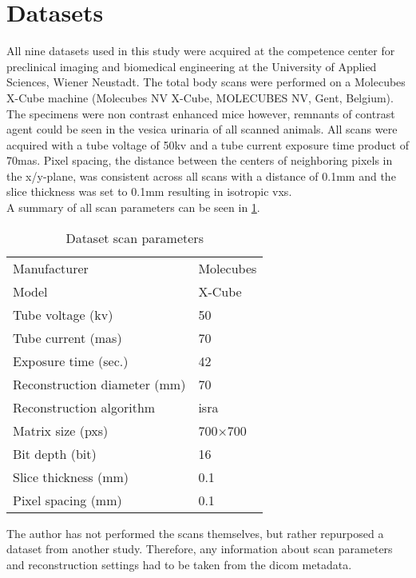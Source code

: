 \section{Datasets}\label{s:datasets}
All nine datasets used in this study were acquired at the competence center for preclinical imaging and biomedical engineering at the University of Applied Sciences, Wiener Neustadt.
The total body scans were performed on a Molecubes X-Cube \mct\space machine (Molecubes NV X-Cube, MOLECUBES NV, Gent, Belgium).
The specimens were non contrast enhanced mice however, remnants of contrast agent could be seen in the vesica urinaria of all scanned animals.
All scans were acquired with a tube voltage of 50\acrshort{kv} and a tube current exposure time product of 70\acrshort{mas}.
Pixel spacing, the distance between the centers of neighboring pixels in the x/y-plane, was consistent across all scans with a distance of 0.1mm and the slice thickness was set to 0.1mm resulting in isotropic \glspl{vx}.\\
A summary of all scan parameters can be seen in \cref{tab:scan-parameters}.
\begin{table}
	\begin{center}
		\begin{tabular}{l l}
			Manufacturer                  & Molecubes      \\
			Model                         & X-Cube         \\
			Tube voltage (\acrshort{kv})  & 50             \\
			Tube current (\acrshort{mas}) & 70             \\
			Exposure time (sec.)          & 42             \\
			Reconstruction diameter (mm)  & 70             \\
			Reconstruction algorithm      & \gls{isra}     \\
			Matrix size (\glspl{px})      & 700$\times$700 \\
			Bit depth (\gls{bit})         & 16             \\
			Slice thickness (mm)          & 0.1            \\
			Pixel spacing (mm)            & 0.1            \\
		\end{tabular}
		\caption{Dataset scan parameters}\label{tab:scan-parameters}
	\end{center}
\end{table}
\noindent
The author has not performed the scans themselves, but rather repurposed a dataset from another study.
Therefore, any information about scan parameters and reconstruction settings had to be taken from the \gls{dicom} metadata.


